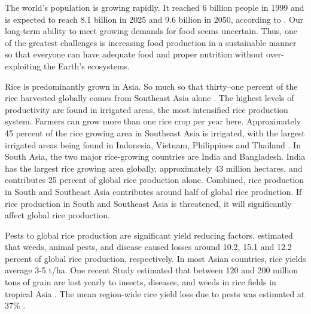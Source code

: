 ﻿%


The world's population is growing rapidly. It reached 6 billion people in 1999 and is expected to reach 8.1 billion in 2025 and 9.6 billion in 2050, according to \citet{un2013world}. Our long-term ability to meet growing demands for food seems uncertain. Thus, one of the greatest challenges is increasing food production in a sustainable manner so that everyone can have adequate food and proper nutrition without over-exploiting the Earth’s ecosystems. 

Rice is predominantly grown in Asia. So much so that thirty--one percent of the rice harvested globally comes from Southeast Asia alone \citep{oecd2012oecd}. The highest levels of productivity are found in irrigated areas, the most intensified rice production system. Farmers can grow more than one rice crop per year here. Approximately 45 percent of the rice growing area in Southeast Asia is irrigated, with the largest irrigated areas being found in Indonesia, Vietnam, Philippines and Thailand \citep{mutert2002developments}. In South Asia, the two major rice-growing countries are India and Bangladesh. India has the largest rice growing area globally, approximately 43 million hectares, and contributes 25 percent of global rice production alone. Combined, rice production in South and Southeast Asia contributes around half of global rice production. If rice production in South and Southeast Asia is threatened, it will significantly affect global rice production. 

Pests to global rice production are significant yield reducing factors. \citet{OERKE:2006ct} estimated that weeds, animal pests, and disease caused losses around 10.2, 15.1 and 12.2 percent of global rice production, respectively. In most Asian countries, rice yields average 3-5 t/ha. One recent Study estimated that between 120 and 200 million tons of grain are lost yearly to insects, diseases, and weeds in rice fields in tropical Asia \citep{willocquet2004research}. The mean region-wide rice yield loss due to pests was estimated at 37\% \citep{Savary:2000vr}.

